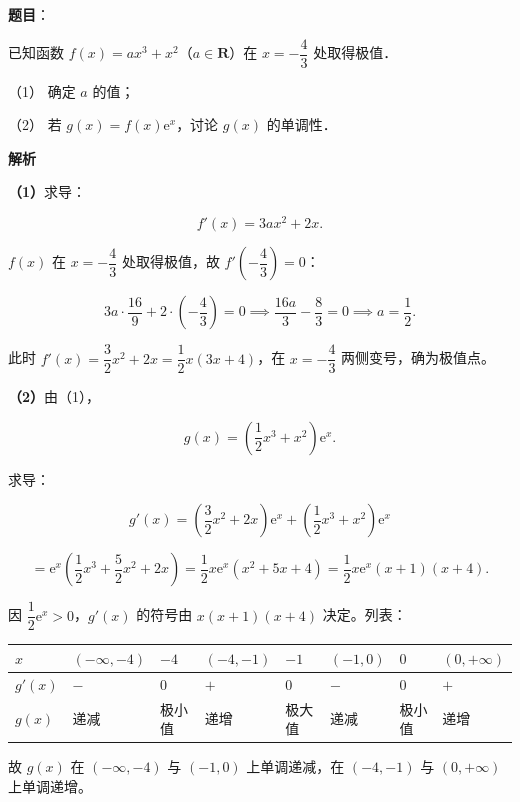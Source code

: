 \begin{answer}

\textbf{题目}：

已知函数 $f(x)=ax^{3}+x^{2}$（$a\in\mathbf{R}$）在 $x=-\dfrac{4}{3}$ 处取得极值．

（1） 确定 $a$ 的值；

（2） 若 $g(x)=f(x)\mathrm{e}^{x}$，讨论 $g(x)$ 的单调性．

\textbf{解析}

\textbf{（1）}求导：

\nopagebreak[4]
\[
f'(x)=3ax^{2}+2x.
\]

$f(x)$ 在 $x=-\dfrac{4}{3}$ 处取得极值，故 $f'\left(-\dfrac{4}{3}\right)=0$：

\nopagebreak[4]
\[
3a\cdot\frac{16}{9}+2\cdot\left(-\frac{4}{3}\right)=0
\implies
\frac{16a}{3}-\frac{8}{3}=0
\implies
a=\frac{1}{2}.
\]

此时 $f'(x)=\dfrac{3}{2}x^{2}+2x=\dfrac{1}{2}x(3x+4)$，在 $x=-\dfrac{4}{3}$ 两侧变号，确为极值点。

\textbf{（2）}由（1），

\nopagebreak[4]
\[
g(x)=\left(\frac{1}{2}x^{3}+x^{2}\right)\mathrm{e}^{x}.
\]

求导：

\nopagebreak[4]
\[
g'(x)=\left(\frac{3}{2}x^{2}+2x\right)\mathrm{e}^{x}
+\left(\frac{1}{2}x^{3}+x^{2}\right)\mathrm{e}^{x}
\]

\nopagebreak[4]
\[
=\mathrm{e}^{x}\left(\frac{1}{2}x^{3}+\frac{5}{2}x^{2}+2x\right)
=\frac{1}{2}x\mathrm{e}^{x}(x^{2}+5x+4)
=\frac{1}{2}x\mathrm{e}^{x}(x+1)(x+4).
\]

因 $\dfrac{1}{2}\mathrm{e}^{x}>0$，$g'(x)$ 的符号由 $x(x+1)(x+4)$ 决定。列表：

\begin{center}
\begingroup\setlength{\tabcolsep}{4pt}
\begin{tabular}{llllllll}
\toprule
$x$ & $(-\infty,-4)$ & $-4$ & $(-4,-1)$ & $-1$ & $(-1,0)$ & $0$ & $(0,+\infty)$ \\
\midrule
$g'(x)$ & $-$ & $0$ & $+$ & $0$ & $-$ & $0$ & $+$ \\
$g(x)$ & 递减 & 极小值 & 递增 & 极大值 & 递减 & 极小值 & 递增 \\
\bottomrule
\end{tabular}
\endgroup
\end{center}

故 $g(x)$ 在 $(-\infty,-4)$ 与 $(-1,0)$ 上单调递减，在 $(-4,-1)$ 与 $(0,+\infty)$ 上单调递增。



\end{answer}
